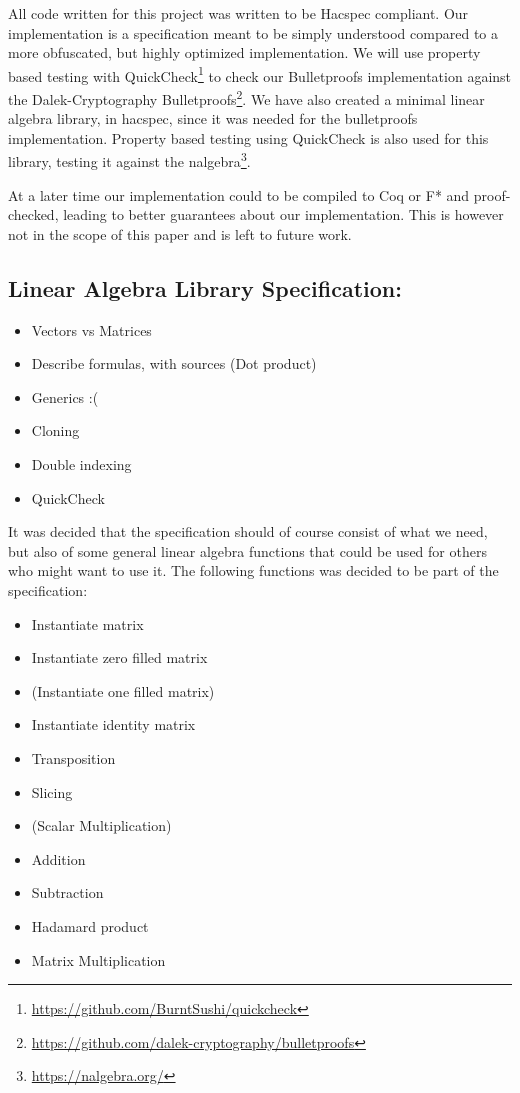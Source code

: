 \documentclass{article}
\begin{document}
All code written for this project was written to be Hacspec
compliant.  Our implementation is a specification meant to
be simply understood compared to a more obfuscated, but highly
optimized implementation. We will use property based testing with
QuickCheck\footnote{\url{https://github.com/BurntSushi/quickcheck}}
to check our Bulletproofs implementation against the Dalek-Cryptography
Bulletproofs\footnote{\url{https://github.com/dalek-cryptography/bulletproofs}}.
We have also created a minimal linear algebra library, in hacspec,
since it was needed for the bulletproofs implementation. Property
based testing using QuickCheck is also used for this library, testing
it against the nalgebra\footnote{\url{https://nalgebra.org/}}.

At a later time our implementation could to be compiled to Coq or F* and
proof-checked, leading to better guarantees about our implementation.
This is however not in the scope of this paper and is left to future
work. %

\subsection{Linear Algebra Library Specification:}
\begin{itemize}
	\item Vectors vs Matrices 
	\item Describe formulas, with sources (Dot product) 
	\item Generics :(
	\item Cloning
	\item Double indexing
	\item QuickCheck
\end{itemize} 

It was decided that the specification should of course consist of what we
need, but also of some general linear algebra functions that could be
used for others who might want to use it. The following functions was
decided to be part of the specification:

\begin{itemize}
	\item Instantiate matrix
	\item Instantiate zero filled matrix
	\item (Instantiate one filled matrix)
	\item Instantiate identity matrix
	\item Transposition
	\item Slicing
	\item (Scalar Multiplication)
	\item Addition
	\item Subtraction
	\item Hadamard product
	\item Matrix Multiplication
\end{itemize}
\end{document}
